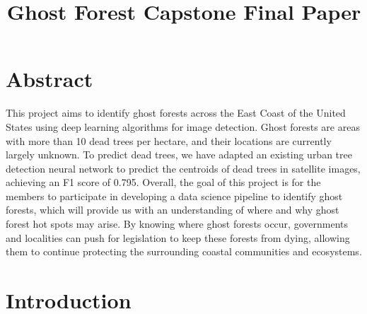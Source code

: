 \documentclass[conference]{ieeetran}
\begin{document}
\title{Ghost Forest Capstone Final Paper}



\author{}

\maketitle


\section{Abstract}

This project aims to identify ghost forests across the East Coast of the United States using deep learning algorithms for image detection. Ghost forests are areas with more than 10 dead trees per hectare, and their locations are currently largely unknown. To predict dead trees, we have adapted an existing urban tree detection neural network \cite{ventura2024individual} to predict the centroids of dead trees in satellite images, achieving an F1 score of 0.795. Overall, the goal of this project is for the members to participate in developing a data science pipeline to identify ghost forests, which will provide us with an understanding of where and why ghost forest hot spots may arise. By knowing where ghost forests occur, governments and localities can push for legislation to keep these forests from dying, allowing them to continue protecting the surrounding coastal communities and ecosystems. 
 
\section{Introduction}
\end{document}
